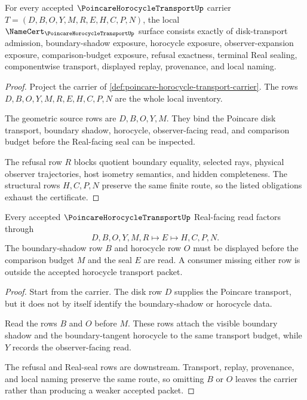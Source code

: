 \begin{theorem}
\label{thm:poincare-horocycle-transport-namecert-obligations}
For every accepted $\PoincareHorocycleTransportUp$ carrier $T=(D,B,O,Y,M,R,E,H,C,P,N)$, the local $\NameCert_{\PoincareHorocycleTransportUp}$ surface consists exactly of disk-transport admission, boundary-shadow exposure, horocycle exposure, observer-expansion exposure, comparison-budget exposure, refusal exactness, terminal Real sealing, componentwise transport, displayed replay, provenance, and local naming.
\end{theorem}
\begin{proof}
Project the carrier of \autoref{def:poincare-horocycle-transport-carrier}. The rows $D,B,O,Y,M,R,E,H,C,P,N$ are the whole local inventory.

The geometric source rows are $D,B,O,Y,M$. They bind the Poincare disk transport, boundary shadow, horocycle, observer-facing read, and comparison budget before the Real-facing seal can be inspected.

The refusal row $R$ blocks quotient boundary equality, selected rays, physical observer trajectories, host isometry semantics, and hidden completeness. The structural rows $H,C,P,N$ preserve the same finite route, so the listed obligations exhaust the certificate.
\end{proof}

\begin{theorem}
\label{thm:poincare-horocycle-transport-boundary-shadow-handoff}
Every accepted $\PoincareHorocycleTransportUp$ Real-facing read factors through
$$
D,B,O,Y,M,R \longmapsto E \longmapsto H,C,P,N .
$$
The boundary-shadow row $B$ and horocycle row $O$ must be displayed before the comparison budget $M$ and the seal $E$ are read. A consumer missing either row is outside the accepted horocycle transport packet.
\end{theorem}
\begin{proof}
Start from the carrier. The disk row $D$ supplies the Poincare transport, but it does not by itself identify the boundary-shadow or horocycle data.

Read the rows $B$ and $O$ before $M$. These rows attach the visible boundary shadow and the boundary-tangent horocycle to the same transport budget, while $Y$ records the observer-facing read.

The refusal and Real-seal rows are downstream. Transport, replay, provenance, and local naming preserve the same route, so omitting $B$ or $O$ leaves the carrier rather than producing a weaker accepted packet.
\end{proof}

